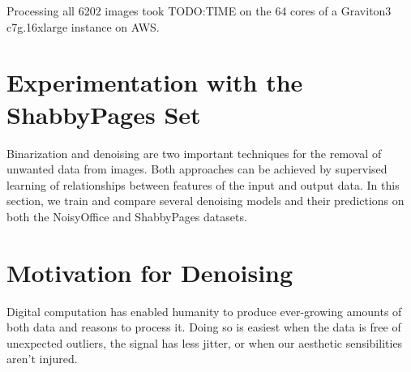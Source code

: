 \documentclass[runningheads]{llncs}
\begin{document}
Processing all 6202 images took TODO:TIME on the 64 cores of a Graviton3 c7g.16xlarge instance on AWS.

\section{Experimentation with the ShabbyPages Set}
Binarization and denoising are two important techniques for the removal of unwanted data from images. Both approaches can be achieved by supervised learning of relationships between features of the input and output data. In this section, we train and compare several denoising models and their predictions on both the NoisyOffice and ShabbyPages datasets.

\section{Motivation for Denoising}
Digital computation has enabled humanity to produce ever-growing amounts of both data and reasons to process it. Doing so is easiest when the data is free of unexpected outliers, the signal has less jitter, or when our aesthetic sensibilities aren't injured.\\
\end{document}
